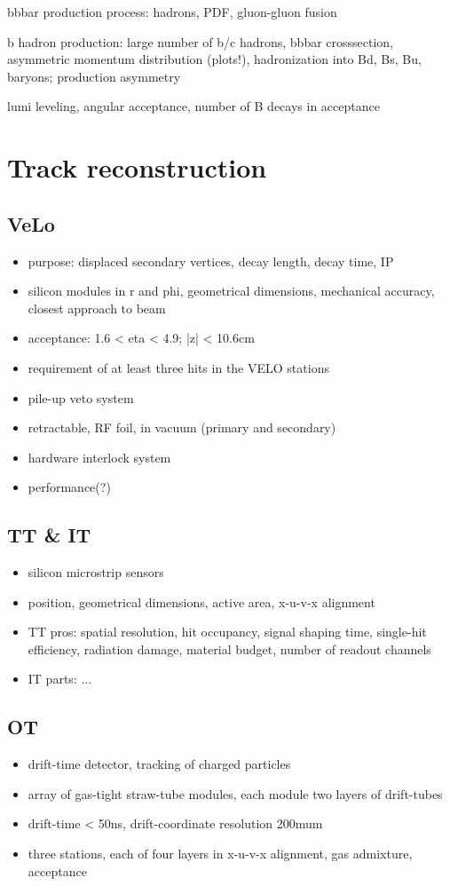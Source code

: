 \newpage

bbbar production process:
hadrons, PDF, gluon-gluon fusion

b hadron production:
large number of b/c hadrons, bbbar crosssection, asymmetric momentum distribution (plots!), hadronization into Bd, Bs, Bu, baryons; production asymmetry


lumi leveling, angular acceptance, number of B decays in acceptance
\section{Track reconstruction}
\subsection{VeLo}
\begin{itemize}
  \item purpose: displaced secondary vertices, decay length, decay time, IP
  \item silicon modules in r and phi, geometrical dimensions, mechanical accuracy, closest approach to beam
  \item acceptance: 1.6 < eta < 4.9; |z| < 10.6cm
  \item requirement of at least three hits in the VELO stations
  \item pile-up veto system
  \item retractable, RF foil, in vacuum (primary and secondary)
  \item hardware interlock system
  \item performance(?)
\end{itemize}
\subsection{TT \& IT}
\begin{itemize}
  \item silicon microstrip sensors
  \item position, geometrical dimensions, active area, x-u-v-x alignment
  \item TT pros: spatial resolution, hit occupancy, signal shaping time, single-hit efficiency, radiation damage, material budget, number of readout channels
  \item IT parts: ...
\end{itemize}
\subsection{OT}
\begin{itemize}
  \item drift-time detector, tracking of charged particles
  \item array of gas-tight straw-tube modules, each module two layers of drift-tubes
  \item drift-time < 50ns, drift-coordinate resolution 200mum
  \item three stations, each of four layers in x-u-v-x alignment, gas admixture, acceptance
\end{itemize}

